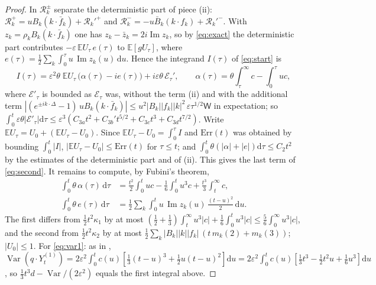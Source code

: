 \documentclass[11pt]{article}
\newcommand{\dd}{\mathrm{d}}
\newcommand{\E}{\mathbb{E}}
\newcommand{\eps}{\varepsilon}
\newcommand{\cR}{\mathcal{R}}
\newcommand{\cE}{\mathcal{E}}
\newcommand{\sW}{\mathsf{W}}
\renewcommand{\Im}{\operatorname{Im}}
\theoremstyle{remark}
\begin{document}
\begin{proof}
In $\cR_k^\pm$ separate the deterministic part of piece (ii):
$\cR_k^+ = uB_k(k\cdot\bar f_k)+\cR_k'^{+}$ and
$\cR_k^- = -u\bar B_k(k\cdot f_k)+\cR_k'^{-}$. With
$z_k = \rho_kB_k(k\cdot\bar f_k)$ one has $z_k-\bar z_k = 2i\Im z_k$, so by
\eqref{eq:exact} the deterministic part contributes
$-\eps\,\E U_\tau\,e(\tau)$ to $\E[gU_\tau]$, where
$e(\tau) = \frac12\sum_k\int_0^\tau u\,\Im z_k(u)\,\dd u$. Hence the integrand
$I(\tau)$ of \eqref{eq:start} is
\[
  I(\tau) = \eps^2\theta\;\E U_\tau\,\bigl(\alpha(\tau)-ie(\tau)\bigr)+i\eps\theta\,\cE_\tau',
  \qquad\alpha(\tau) = \theta\int_\tau^\infty c-\int_0^\tau uc ,
\]
where $\cE'_\tau$ is bounded as $\cE_\tau$ was, without the term (ii) and
with the additional term
$|(e^{\pm ik\cdot\Delta}-1)\,uB_k(k\cdot\bar f_k)|\le u^2|B_k||f_k||k|^2\,\eps\tau^{1/2}\sW$
in expectation; so
$\int_0^t\eps\theta|\cE'_\tau|\dd\tau\le\eps^3(C_{3a}t^2+C_{3b}'t^{5/2}+C_{3c}t^3+C_{3d}t^{7/2})$.
Write $\E U_\tau = U_0+(\E U_\tau-U_0)$. Since
$\E U_\tau-U_0 = \int_0^\tau I$ and $\mathrm{Err}(t)$ was obtained by bounding
$\int_0^t|I|$, $|\E U_\tau-U_0|\le\mathrm{Err}(t)$ for $\tau\le t$; and
$\int_0^t\theta(|\alpha|+|e|)\dd\tau\le C_2t^2$ by the estimates of the
deterministic part and of (ii). This gives the last term of
\eqref{eq:second}. It remains to compute, by Fubini's theorem,
\begin{align*}
  \int_0^t\theta\,\alpha(\tau)\,\dd\tau
  &= \frac{t^2}{2}\int_0^tuc-\frac16\int_0^tu^3c+\frac{t^3}{3}\int_t^\infty c ,\\
  \int_0^t\theta\,e(\tau)\,\dd\tau
  &= \frac12\sum_k\int_0^tu\,\Im z_k(u)\,\frac{(t-u)^2}{2}\,\dd u .
\end{align*}
The first differs from $\frac12t^2\kappa_1$ by at most
$(\frac12+\frac13)\int_t^\infty u^3|c|+\frac16\int_0^tu^3|c|\le\frac56\int_0^\infty u^3|c|$,
and the second from $\frac12t^2\kappa_2$ by at most
$\frac12\sum_k|B_k||k||f_k|\,(t\,m_k(2)+m_k(3))$; $|U_0|\le1$. For
\eqref{eq:var1}: as in \cite[Proposition~7]{Note},
$\operatorname{Var}(q\cdot Y^{(1)}_t)
= 2\eps^2\int_0^tc(u)[\frac13(t-u)^3+\frac12u(t-u)^2]\dd u
= 2\eps^2\int_0^tc(u)[\frac13t^3-\frac12t^2u+\frac16u^3]\dd u$, so
$\frac13t^3d-\operatorname{Var}/(2\eps^2)$ equals the first integral above.
\end{proof}
\end{document}
